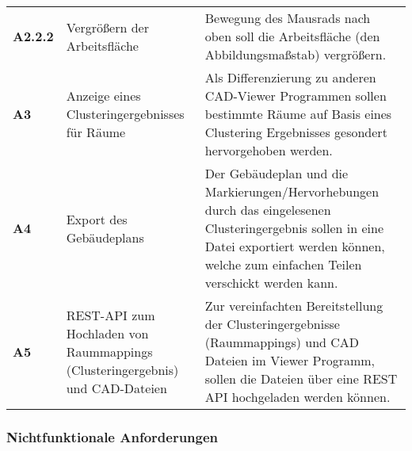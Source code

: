 \begin{center}
\begin{supertabular}{ p{1cm}|p{3cm}|p{4cm} }
        \textbf{A2.2.2} & Vergrößern der Arbeitsfläche                  & Bewegung des Mausrads nach oben soll die Arbeitsfläche (den Abbildungsmaßstab) vergrößern.                                                                                                       \\
        \textbf{A3}     & Anzeige eines Clusteringergebnisses für Räume & Als Differenzierung zu anderen CAD-Viewer Programmen sollen bestimmte Räume auf Basis eines Clustering Ergebnisses gesondert hervorgehoben werden.                                               \\
        \textbf{A4}     & Export des Gebäudeplans                       & Der Gebäudeplan und die Markierungen/Hervorhebungen durch das eingelesenen Clusteringergebnis sollen in eine Datei exportiert werden können, welche zum einfachen Teilen verschickt werden kann. \\
        \textbf{A5}     & REST-API zum Hochladen von Raummappings (Clusteringergebnis) und CAD-Dateien & Zur vereinfachten Bereitstellung der Clusteringergebnisse (Raummappings) und CAD Dateien im Viewer Programm, sollen die Dateien über eine REST API hochgeladen werden können. \\
    \end{supertabular}
\end{center}

\vspace{10pt}

\subsubsection{Nichtfunktionale Anforderungen}
\label{subsubsec:non-functional-requirements}

